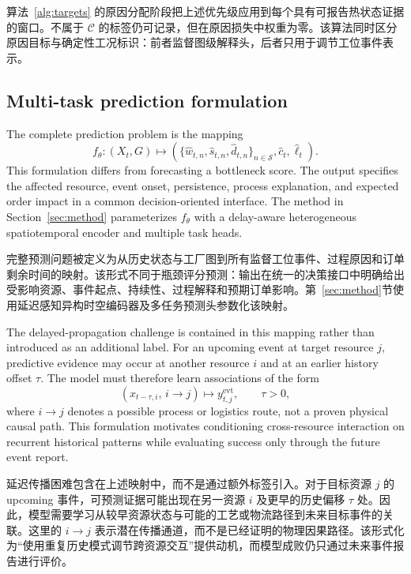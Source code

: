 \documentclass[a4paper,fleqn]{cas-dc}
\newcommand{\zhpara}[1]{%
  \par\begingroup\small\color{black!72}\noindent #1\par\endgroup}
\begin{document}
\zhpara{算法~\ref{alg:targets} 的原因分配阶段把上述优先级应用到每个具有可报告热状态证据的窗口。不属于 $\mathcal{C}$ 的标签仍可记录，但在原因损失中权重为零。该算法同时区分原因目标与确定性工况标识：前者监督图级解释头，后者只用于调节工位事件表示。}

\subsection{Multi-task prediction formulation}

The complete prediction problem is the mapping
\begin{equation}
f_{\theta}:(X_t,G)\longmapsto
\left(
\{\hat w_{t,n},\hat s_{t,n},\hat d_{t,n}\}_{n\in\mathcal{S}},
\hat c_t,\hat\ell_t
\right).
\end{equation}
This formulation differs from forecasting a bottleneck score. The output specifies the affected resource, event onset, persistence, process explanation, and expected order impact in a common decision-oriented interface. The method in Section~\ref{sec:method} parameterizes $f_{\theta}$ with a delay-aware heterogeneous spatiotemporal encoder and multiple task heads.

\zhpara{完整预测问题被定义为从历史状态与工厂图到所有监督工位事件、过程原因和订单剩余时间的映射。该形式不同于瓶颈评分预测：输出在统一的决策接口中明确给出受影响资源、事件起点、持续性、过程解释和预期订单影响。第~\ref{sec:method}节使用延迟感知异构时空编码器及多任务预测头参数化该映射。}

The delayed-propagation challenge is contained in this mapping rather than introduced as an additional label. For an upcoming event at target resource $j$, predictive evidence may occur at another resource $i$ and at an earlier history offset $\tau$. The model must therefore learn associations of the form
\begin{equation}
(x_{t-\tau,i},\,i\!\rightarrow\!j)\longmapsto y^{\mathrm{evt}}_{t,j},
\qquad \tau>0,
\end{equation}
where $i\!\rightarrow\!j$ denotes a possible process or logistics route, not a proven physical causal path. This formulation motivates conditioning cross-resource interaction on recurrent historical patterns while evaluating success only through the future event report.

\zhpara{延迟传播困难包含在上述映射中，而不是通过额外标签引入。对于目标资源 $j$ 的 upcoming 事件，可预测证据可能出现在另一资源 $i$ 及更早的历史偏移 $\tau$ 处。因此，模型需要学习从较早资源状态与可能的工艺或物流路径到未来目标事件的关联。这里的 $i\!\rightarrow\!j$ 表示潜在传播通道，而不是已经证明的物理因果路径。该形式化为“使用重复历史模式调节跨资源交互”提供动机，而模型成败仍只通过未来事件报告进行评价。}
\end{document}
